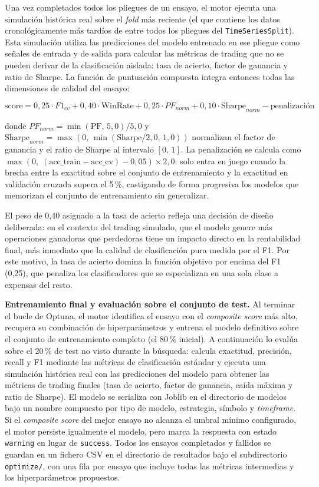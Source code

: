 Una vez completados todos los pliegues de un ensayo, el motor ejecuta una
simulación histórica real sobre el \textit{fold} más reciente (el que contiene
los datos cronológicamente más tardíos de entre todos los pliegues del
\texttt{TimeSeriesSplit}). Esta simulación utiliza las predicciones del modelo
entrenado en ese pliegue como señales de entrada y de salida para calcular las
métricas de trading que no se pueden derivar de la clasificación aislada:
tasa de acierto, factor de ganancia y ratio de Sharpe. La función de puntuación
compuesta integra entonces todas las dimensiones de calidad del ensayo:

$$\text{score} = 0{,}25 \cdot F1_{cv} + 0{,}40 \cdot \text{WinRate} + 0{,}25 \cdot PF_{norm} + 0{,}10 \cdot \text{Sharpe}_{norm} - \text{penalización}$$

donde $PF_{norm} = \min(\text{PF},\,5{,}0) / 5{,}0$ y $\text{Sharpe}_{norm} =
\max(0,\,\min(\text{Sharpe}/2{,}0,\,1{,}0))$ normalizan el factor de ganancia y
el ratio de Sharpe al intervalo $[0,\,1]$. La penalización se calcula como
$\max(0,\; (\text{acc\_train} - \text{acc\_cv}) - 0{,}05) \times 2{,}0$: solo
entra en juego cuando la brecha entre la exactitud sobre el conjunto de
entrenamiento y la exactitud en validación cruzada supera el 5\,\%, castigando
de forma progresiva los modelos que memorizan el conjunto de entrenamiento sin
generalizar.

El peso de 0,40 asignado a la tasa de acierto refleja una decisión de diseño
deliberada: en el contexto del trading simulado, que el modelo genere más
operaciones ganadoras que perdedoras tiene un impacto directo en la
rentabilidad final, más inmediato que la calidad de clasificación pura medida
por el F1. Por este motivo, la tasa de acierto domina la función objetivo por
encima del F1 (0,25), que penaliza los clasificadores que se especializan en
una sola clase a expensas del resto.

\textbf{Entrenamiento final y evaluación sobre el conjunto de test.}
Al terminar el bucle de Optuna, el motor identifica el ensayo con el
\textit{composite score} más alto, recupera su combinación de hiperparámetros
y entrena el modelo definitivo sobre el conjunto de entrenamiento completo
(el 80\,\% inicial). A continuación lo evalúa sobre el 20\,\% de test no
visto durante la búsqueda: calcula exactitud, precisión, recall y F1 mediante
las métricas de clasificación estándar y ejecuta una simulación histórica real
con las predicciones del modelo para obtener las métricas de trading finales
(tasa de acierto, factor de ganancia, caída máxima y ratio de Sharpe). El
modelo se serializa con Joblib en el directorio de modelos bajo un nombre
compuesto por tipo de modelo, estrategia, símbolo y \textit{timeframe}. Si
el \textit{composite score} del mejor ensayo no alcanza el umbral mínimo
configurado, el motor persiste igualmente el modelo, pero marca la respuesta
con estado \texttt{warning} en lugar de \texttt{success}. Todos los ensayos
completados y fallidos se guardan en un fichero CSV en el directorio de
resultados bajo el subdirectorio \texttt{optimize/}, con una fila por ensayo
que incluye todas las métricas intermedias y los hiperparámetros propuestos.

